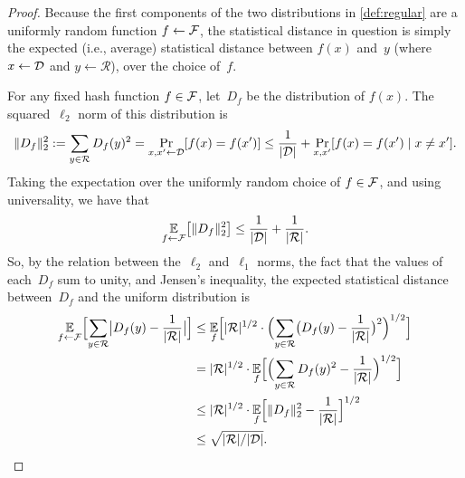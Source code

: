 \documentclass[11pt]{article}
\newcommand{\calR}{\ensuremath{\mathcal{R}}}
\begin{document}
\begin{proof}
  Because the first components of the two distributions in
  \cref{def:regular} are a uniformly random function $f \gets \mathcal{F}$,
  the statistical distance in question is simply the expected (i.e.,
  average) statistical distance between $f(x)$ and~$y$ (where
  $x \gets \mathcal{D}$ and $y \gets \calR$), over the choice of~$f$.
  
  For any fixed hash function $f \in \mathcal{F}$, let~$D_{f}$ be the
  distribution of $f(x)$. The squared~$\ell_{2}$ norm of this
  distribution is
  \[ \length{D_{f}}_{2}^{2} := \sum_{y \in \calR} D_{f}(y)^{2} =
    \Pr_{x,x' \gets \calD}[f(x)=f(x')] \leq \frac{1}{\abs{\calD}} +
    \Pr_{x,x'}[f(x)=f(x') \mid x \neq x'] . \] Taking the expectation
  over the uniformly random choice of $f \in \mathcal{F}$, and using
  universality, we have that
  \[ \E_{f \gets \calF} \bracks[\big]{\length{D_{f}}_{2}^{2}} \leq
    \frac{1}{\abs{\calD}} + \frac{1}{\abs{\calR}} . \] So, by the
  relation between the~$\ell_{2}$ and~$\ell_{1}$ norms, the fact that
  the values of each~$D_{f}$ sum to unity, and Jensen's inequality,
  the expected statistical distance between~$D_{f}$ and the uniform
  distribution is
  \begin{align*}
    \E_{f \gets \calF} \bracks[\Big]{\sum_{y \in \calR} \abs[\big]{D_{f}(y)
    - \frac{1}{\abs{\calR}}}}
    &\leq \E_{f} \bracks[\Big]{ \abs{\calR}^{1/2} \cdot
      \parens[\Big]{\sum_{y \in \calR}
      \parens[\big]{D_{f}(y) - \frac{1}{\abs{\calR}}}^{2}}^{1/2}} \\
    &= \abs{\calR}^{1/2} \cdot \E_{f} \bracks[\Big]{ \parens[\Big]{
      \sum_{y \in \calR} D_{f}(y)^{2} - \frac{1}{\abs{\calR}}}^{1/2}} \\
    &\leq \abs{\calR}^{1/2} \cdot \E_{f}
      \bracks[\Big]{\length{D_{f}}_{2}^{2} -
      \frac{1}{\abs{\calR}}}^{1/2} \\
    &\leq \sqrt{\abs{\calR}/\abs{\calD}} .
  \end{align*}
\end{proof}



\end{document}

